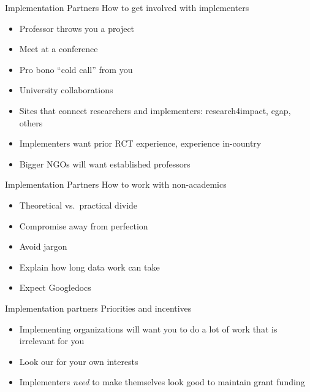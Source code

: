 \documentclass[11pt,ignorenonframetext,xcolor={svgnames}]{beamer}
\providecommand{\tightlist}{%
  \setlength{\itemsep}{0pt}\setlength{\parskip}{0pt}}
\begin{document}
\begin{frame}{Implementation Partners}
\protect\hypertarget{implementation-partners}{}
How to get involved with implementers

\begin{itemize}
\item
  Professor throws you a project
\item
  Meet at a conference
\item
  Pro bono ``cold call'' from you
\item
  University collaborations
\item
  Sites that connect researchers and implementers: research4impact,
  egap, others
\item
  Implementers want prior RCT experience, experience in-country
\item
  Bigger NGOs will want established professors
\end{itemize}
\end{frame}

\begin{frame}{Implementation Partners}
\protect\hypertarget{implementation-partners-1}{}
How to work with non-academics

\begin{itemize}
\tightlist
\item
  Theoretical vs.~practical divide
\item
  Compromise away from perfection
\item
  Avoid jargon
\item
  Explain how long data work can take
\item
  Expect Googledocs
\end{itemize}
\end{frame}

\begin{frame}{Implementation partners}
\protect\hypertarget{implementation-partners-2}{}
Priorities and incentives

\begin{itemize}
\tightlist
\item
  Implementing organizations will want you to do a lot of work that is
  irrelevant for you
\item
  Look our for your own interests
\item
  Implementers \emph{need} to make themselves look good to maintain
  grant funding
\end{itemize}
\end{frame}
\end{document}
